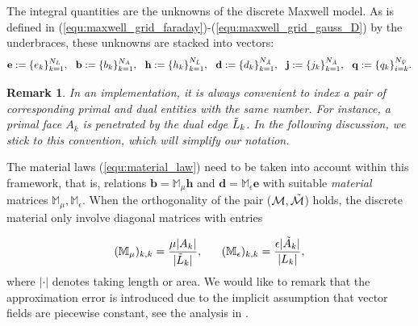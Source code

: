 \documentclass{article}
\newtheorem*{remark}{Remark}
\begin{document}
The integral quantities are the unknowns of the discrete Maxwell model. As is defined in (\ref{equ:maxwell_grid_faraday})-(\ref{equ:maxwell_grid_gauss_D}) by the underbraces, these unknowns are stacked into vectors:
\begin{equation} \label{equ:fit_scale_vector}
    \mathbf{e} := \{e_k\}_{k=1}^{N_L},\ \ \mathbf{b} := \{b_k\}_{k=1}^{N_A}, \ \ \mathbf{h} := \{h_k\}_{k=1}^{N_{\Tilde{L}}}, \ \ \mathbf{d} := \{d_k\}_{k=1}^{N_{\Tilde{A}}}, \ \ \mathbf{j} := \{j_k\}_{k=1}^{N_{\Tilde{A}}}, \ \ \mathbf{q} := \{q_k\}_{i=k}^{N_{\Tilde{V}}}.
\end{equation}

\begin{remark}
    In an implementation, it is always convenient to index a pair of corresponding primal and dual entities with the same number. For instance, a primal face $A_k$ is penetrated by the dual edge $\Tilde{L}_k$. In the following discussion, we stick to this convention, which will simplify our notation.
\end{remark}

The material laws (\ref{equ:material_law}) need to be taken into account within this framework, that is, relations $\mathbf{b} = \mathbb{M}_\mu \mathbf{h}$ and $\mathbf{d} = \mathbb{M}_\epsilon \mathbf{e}$ with suitable \emph{material} matrices $\mathbb{M}_\mu, \mathbb{M}_\epsilon$. When the orthogonality of the pair ($\mathcal{M}, \Tilde{\mathcal{M}}$) holds, the discrete material only involve diagonal matrices with entries 

\begin{equation*}
    (\mathbb{M}_\mu)_{k,k} = \frac{\mu|A_k|}{|\Tilde{L}_k|}, \ \ \ \ \ (\mathbb{M}_\epsilon)_{k,k} = \frac{\epsilon |\Tilde{A}_k|}{|L_k|},
\end{equation*}
where $|\cdot|$ denotes taking length or area. We would like to remark that the approximation error is introduced due to the implicit assumption that vector fields are piecewise constant, see the analysis in \cite[][Sec. 3.2]{Marrone_2001}.
\end{document}
